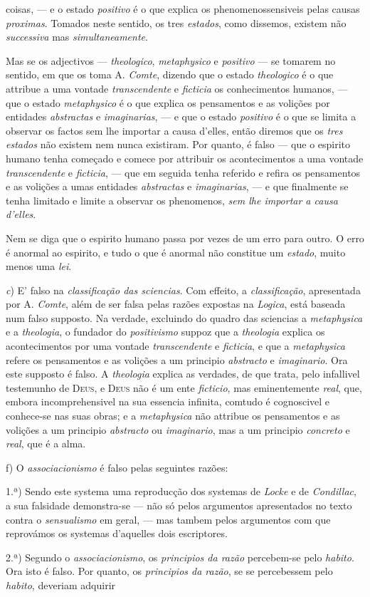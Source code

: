 coisas, --- e o estado \emph{positivo} é o que explica os phenomenossensiveis pelas causas \emph{proximas}. Tomados neste sentido, os tres \emph{estados}, como dissemos, existem não \emph{successiva} mas \emph{simultaneamente}.\par Mas se os adjectivos --- \emph{theologico}, \emph{metaphysico} e \emph{positivo} --- se tomarem no sentido, em que os toma A. \emph{Comte}, dizendo que o estado \emph{theologico} é o que attribue a uma vontade \emph{transcendente} e \emph{ficticia} os conhecimentos humanos, --- que o estado \emph{metaphysico} é o que explica os pensamentos e as volições por entidades \emph{abstractas} e \emph{imaginarias}, --- e que o estado \emph{positivo} é o que se limita a observar os factos sem lhe importar a causa d'elles, então diremos que os \emph{tres estados} não existem nem nunca existiram. Por quanto, é falso --- que o espirito humano tenha começado e comece por attribuir os acontecimentos a uma vontade \emph{transcendente} e \emph{ficticia}, --- que em seguida tenha referido e refira os pensamentos e as volições a umas entidades \emph{abstractas} e \emph{imaginarias}, --- e que finalmente se tenha limitado e limite a observar os phenomenos, \emph{sem lhe importar a causa d'elles}.\par Nem se diga que o espirito humano passa por vezes de um erro para outro. O erro é anormal ao espirito, e tudo o que é anormal não constitue um \emph{estado}, muito menos uma \emph{lei}.\par \emph{c}) E' falso na \emph{classificação das sciencias}. Com effeito, a \emph{classificação}, apresentada por A. \emph{Comte}, além de ser falsa pelas razões expostas na \emph{Logica}, está baseada num falso supposto. Na verdade, excluindo do quadro das sciencias a \emph{metaphysica} e a \emph{theologia}, o fundador do \emph{positivismo} suppoz que a \emph{theologia} explica os acontecimentos por uma vontade \emph{transcendente} e \emph{ficticia}, e que a \emph{metaphysica} refere os pensamentos e as volições a um principio \emph{abstracto} e \emph{imaginario}. Ora este supposto é falso. A \emph{theologia} explica as verdades, de que trata, pelo infallivel testemunho de \textsc{Deus}, e \textsc{Deus} não é um ente \emph{ficticio}, mas eminentemente \emph{real}, que, embora incomprehensivel na sua essencia infinita, comtudo é cognoscivel e conhece-se nas suas obras; e a \emph{metaphysica} não attribue os pensamentos e as volições a um principio \emph{abstracto} ou \emph{imaginario}, mas a um principio \emph{concreto} e \emph{real}, que é a alma.\par f) O \emph{associacionismo} é falso pelas seguintes razões:\par 1.ª) Sendo este systema uma reproducção dos systemas de \emph{Locke} e de \emph{Condillac}, a sua falsidade demonstra-se --- não só pelos argumentos apresentados no texto contra o \emph{sensualismo} em geral, --- mas tambem pelos argumentos com que reprovámos os systemas d'aquelles dois escriptores.\par 2.ª) Segundo o \emph{associacionismo}, os \emph{principios da razão} percebem-se pelo \emph{habito}. Ora isto é falso. Por quanto, os \emph{principios da razão}, se se percebessem pelo \emph{habito}, deveriam adquirir 